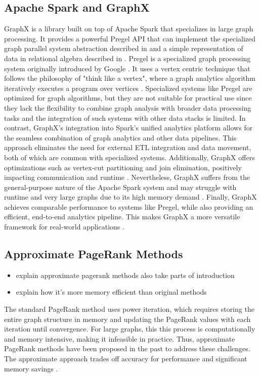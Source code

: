 \subsection{Apache Spark and GraphX}


GraphX is a library built on top of Apache Spark that specializes in large graph processing. It provides a powerful Pregel API that can implement the specialized graph parallel system abstraction described in\cite{malewicz_pregel_2010} and a simple representation of data in relational algebra described in \cite{xin_graphx_2014}. Pregel is a specialized graph processing system originally introduced by Google \cite{malewicz_pregel_2010}. It uses a vertex centric technique that follows the philosophy of "think like a vertex", where a graph analytics algorithm iteratively executes a program over vertices \cite{xin_graphx_2014}. 
Specialized systems like Pregel are optimized for graph algorithms, but they are not suitable for practical use since they lack the flexibility to combine graph analysis with broader data processing tasks and the integration of such systems with other data stacks is limited. In contrast, GraphX's integration into Spark's unified analytics platform allows for the seamless combination of graph analytics and other data pipelines. This approach eliminates the need for external ETL integration and data movement, both of which are common with specialized systems. Additionally, GraphX offers optimizations such as vertex-cut partitioning and join elimination, positively impacting communication and runtime \cite{xin_graphx_2014}. Nevertheless, GraphX suffers from the general-purpose nature of the Apache Spark system and may struggle with runtime and very large graphs due to its high memory demand \cite{zhuo_distributed_2021}.  
Finally, GraphX achieves comparable performance to systems like Pregel, while also providing an efficient, end-to-end analytics pipeline. This makes GraphX a more versatile framework for real-world applications \cite{xin_graphx_2014}.


\subsection{Approximate PageRank Methods}
\begin{itemize}
    \item explain approximate pagerank methods also take parts of introduction
    \item explain how it's more memory efficient than original methods
\end{itemize}

The standard PageRank method uses power iteration, which requires storing the entire graph structure in memory and updating the PageRank values with each iteration until convergence. For large graphs, this this process is computationally and memory intensive, making it infeasible in practice. Thus, approximate PageRank methods have been proposed in the past to address these challenges. The approximate approach trades off accuracy for performance and significant memory savings \cite{wu_efficient_2024}. 